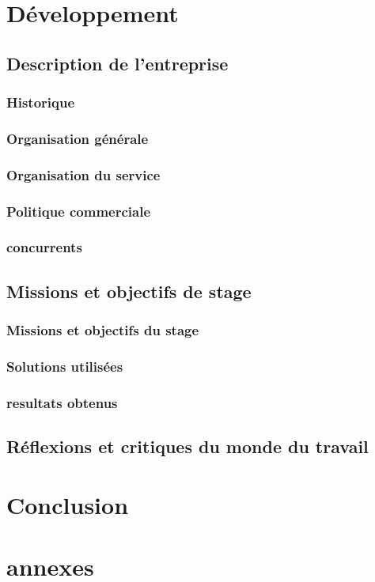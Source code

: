 \documentclass[12pt]{report}
\begin{document}
\chapter*{D\'eveloppement}
	\section{Description de l'entreprise}
		\subsection{Historique}
		\subsection{Organisation g\'en\'erale}
		\subsection{Organisation du service}
		\subsection{Politique commerciale}
		\subsection{concurrents}
	\section{Missions et objectifs de stage}
		\subsection{Missions et objectifs du stage}
		\subsection{Solutions utilis\'ees}
		\subsection{resultats obtenus}
	\section{R\'eflexions et critiques du monde du travail}
\chapter*{Conclusion}
\chapter*{annexes}
\end{document}
